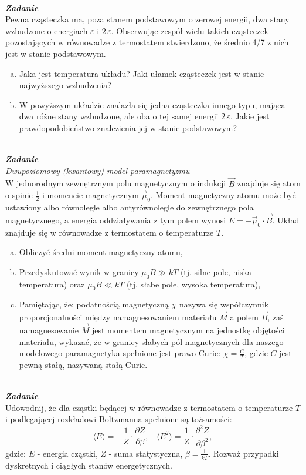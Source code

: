 \documentclass[11pt,a4paper]{article}
\newcounter{zadanie}\newcommand{\zadanie}[1][]{\addtocounter{zadanie}{1} ~\\  {\bf \emph{Zadanie \arabic{zadanie} #1 }} \\}
\begin{document}
\zadanie
Pewna cząsteczka ma, poza stanem podstawowym o zerowej energii, dwa stany wzbudzone o energiach $\varepsilon$ i $2\,\varepsilon$.
Obserwując zespół wielu takich cząsteczek pozostających w równowadze z 
termostatem stwierdzono, że średnio 4/7 z nich jest w stanie podstawowym.
\begin{enumerate}[a)]
\item Jaka jest temperatura układu? 
      Jaki ułamek cząsteczek jest w stanie najwyższego wzbudzenia?
\item W powyższym układzie znalazła się jedna cząsteczka innego typu, 
      mająca dwa różne stany wzbudzone, ale oba o tej samej energii $2\,\varepsilon$. 
      Jakie jest prawdopodobieństwo znalezienia jej w stanie podstawowym?
\end{enumerate}


\zadanie
{\em Dwupoziomowy (kwantowy) model paramagnetyzmu}\\
W jednorodnym zewnętrznym polu magnetycznym o indukcji $\vec{B}$
znajduje się atom o spinie $\frac{1}{2}$ i momencie magnetycznym $\vec{\mu}_0$.
Moment magnetyczny atomu może być ustawiony albo równolegle albo antyrównolegle do
zewnętrznego pola magnetycznego, a energia oddziaływania z tym polem wynosi
$\displaystyle E = - \vec{\mu}_0 \cdot \vec{B}$.
Układ znajduje się w równowadze z termostatem o temperaturze $T$.
\begin{enumerate}[a)]
\item Obliczyć średni moment magnetyczny atomu,
\item Przedyskutować wynik w granicy $\mu_0 B \gg k T$ (tj. silne pole, niska temperatura) oraz $\mu_0 B \ll k T$ (tj. słabe pole, wysoka temperatura),
\item Pamiętając, że: podatnością magnetyczną $\chi$ nazywa się współczynnik proporcjonalności między namagnesowaniem materiału $\vec{M}$ a polem $\vec{B}$,
zaś namagnesowanie $\vec{M}$ jest momentem magnetycznym na jednostkę 
objętości materiału, wykazać, że w granicy słabych pól magnetycznych dla naszego modelowego paramagnetyka spełnione jest prawo Curie:
$\displaystyle \chi = \frac{C}{T}$,
gdzie $C$ jest pewną stałą, nazywaną stałą Curie.
\end{enumerate}

\pagebreak
\zadanie
Udowodnij, że dla cząstki będącej w równowadze z termostatem o temperaturze $T$ i 
podlegającej rozkładowi Boltzmanna spełnione są tożsamości:
\[ \langle E\rangle = - \frac{1}{Z} \cdot \frac{\partial Z}{\partial \beta}, ~~~~
\langle E^2\rangle = \frac{1}{Z} \cdot \frac{\partial^2 Z}{\partial \beta^2}, \]
gdzie: $E$ - energia cząstki, $Z$ - suma statystyczna, $\beta = \frac{1}{k T}$.
Rozważ przypadki dyskretnych i ciągłych stanów energetycznych.
\end{document}
